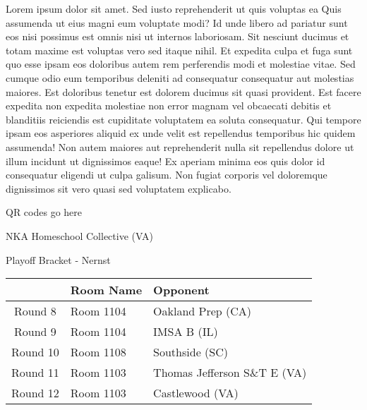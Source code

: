 \documentclass{article}%
\begin{document}
\vspace*{8pt}%
\linebreak%
\newline%
\newline%
Lorem ipsum dolor sit amet. Sed iusto reprehenderit ut quis voluptas ea Quis assumenda ut eius magni eum voluptate modi? Id unde libero ad pariatur sunt eos nisi possimus est omnis nisi ut internos laboriosam. Sit nesciunt ducimus et totam maxime est voluptas vero sed itaque nihil. Et expedita culpa et fuga sunt quo esse ipsam eos doloribus autem rem perferendis modi et molestiae vitae.\newline%
\newline%
Sed cumque odio eum temporibus deleniti ad consequatur consequatur aut molestias maiores. Est doloribus tenetur est dolorem ducimus sit quasi provident. Est facere expedita non expedita molestiae non error magnam vel obcaecati debitis et blanditiis reiciendis est cupiditate voluptatem ea soluta consequatur. Qui tempore ipsam eos asperiores aliquid ex unde velit est repellendus temporibus hic quidem assumenda!\newline%
\newline%
Non autem maiores aut reprehenderit nulla sit repellendus dolore ut illum incidunt ut dignissimos eaque! Ex aperiam minima eos quis dolor id consequatur eligendi ut culpa galisum. Non fugiat corporis vel doloremque dignissimos sit vero quasi sed voluptatem explicabo.\newline%
\newline%
%
\vspace*{30pt}%
\begin{center}%
\begin{Huge}%
QR codes go here%
\end{Huge}%
\end{center}%
\newpage%
\begin{center}%
\begin{Huge}%
NKA Homeschool Collective (VA)%
\end{Huge}%
\vspace*{8pt}%
\linebreak%
\begin{Large}%
Playoff Bracket {-} Nernst%
\end{Large}%
\end{center}%
%
\begin{tabularx}{\textwidth}{|c|Y|Y|}%
\hline%
&Room Name&Opponent\\%
\hline%
Round 8&Room 1104&Oakland Prep (CA)\\%
Round 9&Room 1104&IMSA B (IL)\\%
Round 10&Room 1108&Southside (SC)\\%
Round 11&Room 1103&Thomas Jefferson S\&T E (VA)\\%
Round 12&Room 1103&Castlewood (VA)\\%
\hline%
\end{tabularx}%
\end{document}

